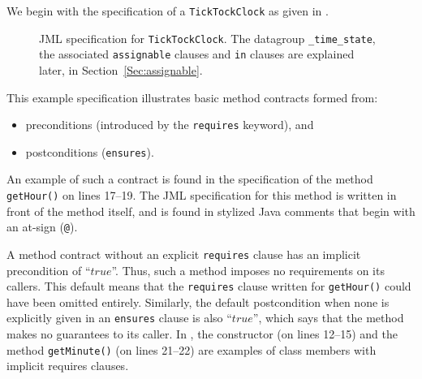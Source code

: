 \documentclass{llncs}
\begin{document}
%
We begin with the specification of a \texttt{TickTockClock} as given in
.
\begin{figure}[tbp]
%
%
\vspace*{-2ex} %
\caption{JML specification for \texttt{TickTockClock}.
  The datagroup \texttt{\_time\_state}, the
  associated \texttt{assignable} clauses and \texttt{in} clauses are
  explained later, in Section~\ref{Sec:assignable}.} 
\label{Example:TickTockClock}
\end{figure}
This example specification illustrates basic
method contracts formed from:
%
\begin{itemize}
  \item preconditions (introduced by the \texttt{requires} keyword), and
  \item postconditions (\texttt{ensures}).
\end{itemize}
An example of such a contract is found in the specification of the
method \texttt{getHour()} on lines 17--19.  The JML specification for
this method is written in front of the method itself, and is found in
stylized Java comments 
that begin with an at-sign (\texttt{@}).

%

% 
%
A method contract without an explicit \texttt{requires} clause has
an implicit precondition of ``$true$''.  Thus, such a
method imposes no requirements on its callers.  This default means
that the \texttt{requires} clause written for \texttt{getHour()} could
have been omitted entirely.
Similarly, the default postcondition 
when none is explicitly given in an \texttt{ensures} clause is also
``$true$'', which says that the method makes no guarantees to
its caller.
In , the constructor (on lines 12--15)
and the method \texttt{getMinute()} (on lines 21--22) are
examples of class members with implicit requires clauses.
\end{document}
